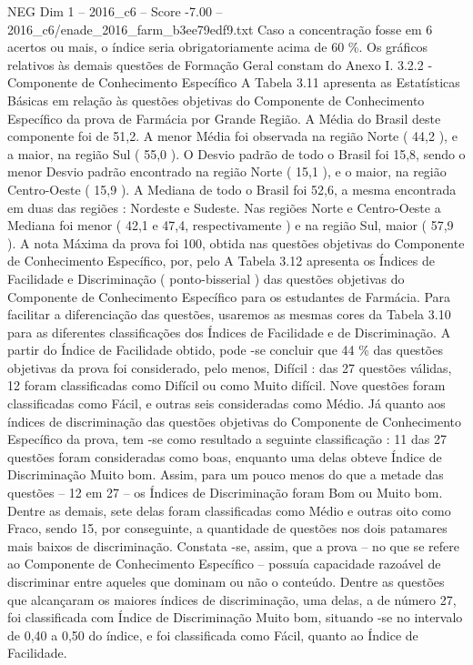 \begin{textsample}{NEG Dim 1 – 2016\_c6 – Score -7.00 – 2016\_c6/enade\_2016\_farm\_b3ee79edf9.txt}
Caso a concentração fosse em 6 acertos ou mais, o índice seria obrigatoriamente acima de 60 \%.
Os gráficos relativos às demais questões de Formação Geral constam do Anexo I. 3.2.2 - Componente de Conhecimento Específico A Tabela 3.11 apresenta as Estatísticas Básicas em relação às questões objetivas do Componente de Conhecimento Específico da prova de Farmácia por Grande Região.
A Média do Brasil deste componente foi de 51,2.
A menor Média foi observada na região Norte ( 44,2 ), e a maior, na região Sul ( 55,0 ).
O Desvio padrão de todo o Brasil foi 15,8, sendo o menor Desvio padrão encontrado na região Norte ( 15,1 ), e o maior, na região Centro-Oeste ( 15,9 ).
A Mediana de todo o Brasil foi 52,6, a mesma encontrada em duas das regiões : Nordeste e Sudeste.
Nas regiões Norte e Centro-Oeste a Mediana foi menor ( 42,1 e 47,4, respectivamente ) e na região Sul, maior ( 57,9 ).
A nota Máxima da prova foi 100, obtida nas questões objetivas do Componente de Conhecimento Específico, por, pelo A Tabela 3.12 apresenta os Índices de Facilidade e Discriminação ( ponto-bisserial ) das questões objetivas do Componente de Conhecimento Específico para os estudantes de Farmácia.
Para facilitar a diferenciação das questões, usaremos as mesmas cores da Tabela 3.10 para as diferentes classificações dos Índices de Facilidade e de Discriminação.
A partir do Índice de Facilidade obtido, pode -se concluir que 44 \% das questões objetivas da prova foi considerado, pelo menos, Difícil : das 27 questões válidas, 12 foram classificadas como Difícil ou como Muito difícil.
Nove questões foram classificadas como Fácil, e outras seis consideradas como Médio.
Já quanto aos índices de discriminação das questões objetivas do Componente de Conhecimento Específico da prova, tem -se como resultado a seguinte classificação : 11 das 27 questões foram consideradas como boas, enquanto uma delas obteve Índice de Discriminação Muito bom.
Assim, para um pouco menos do que a metade das questões – 12 em 27 – os Índices de Discriminação foram Bom ou Muito bom.
Dentre as demais, sete delas foram classificadas como Médio e outras oito como Fraco, sendo 15, por conseguinte, a quantidade de questões nos dois patamares mais baixos de discriminação.
Constata -se, assim, que a prova – no que se refere ao Componente de Conhecimento Específico – possuía capacidade razoável de discriminar entre aqueles que dominam ou não o conteúdo.
Dentre as questões que alcançaram os maiores índices de discriminação, uma delas, a de número 27, foi classificada com Índice de Discriminação Muito bom, situando -se no intervalo de 0,40 a 0,50 do índice, e foi classificada como Fácil, quanto ao Índice de Facilidade.

\end{textsample}
